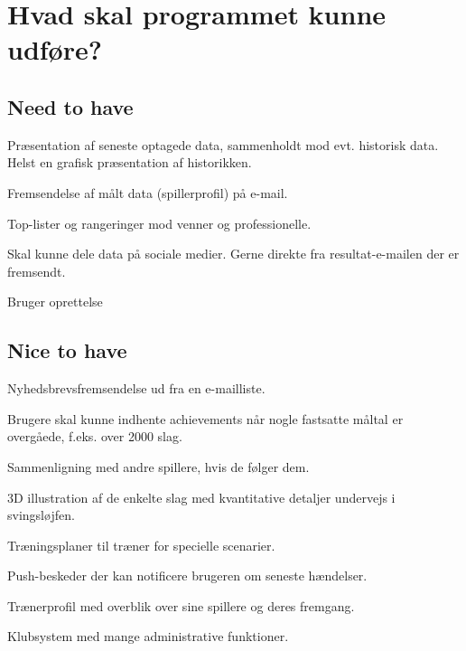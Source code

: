 \section{Hvad skal programmet kunne udføre?}
\label{ch:consultantsInterview:features}

\subsection*{Need to have}
Præsentation af seneste optagede data, sammenholdt mod evt. historisk data.
Helst en grafisk præsentation af historikken.

Fremsendelse af målt data (spillerprofil) på e-mail.

Top-lister og rangeringer mod venner og professionelle.

Skal kunne dele data på sociale medier. 
Gerne direkte fra resultat-e-mailen der er fremsendt.

Bruger oprettelse

\subsection*{Nice to have}
Nyhedsbrevsfremsendelse ud fra en e-mailliste.

Brugere skal kunne indhente achievements når nogle fastsatte måltal er overgåede, f.eks. over 2000 slag.

Sammenligning med andre spillere, hvis de følger dem.

3D illustration af de enkelte slag med kvantitative detaljer undervejs i svingsløjfen.

Træningsplaner til træner for specielle scenarier.

Push-beskeder der kan notificere brugeren om seneste hændelser.

Trænerprofil med overblik over sine spillere og deres fremgang. 

Klubsystem med mange administrative funktioner.
